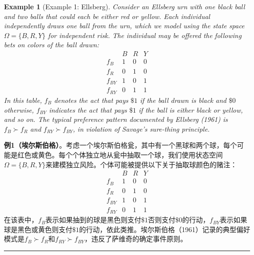 \documentclass[12pt,a4paper]{article}
\newenvironment{translation}
  {\par\noindent\color{blue!70!black}\smallskip}
  {\par\medskip\hrule\medskip}
\newtheorem{example}[theorem]{Example}
\begin{document}
\begin{example}[Example 1: Ellsberg]
Consider an Ellsberg urn with one black ball and two balls that could each be either red or yellow. Each individual independently draws one ball from the urn, which we model using the state space $\Omega = \{B, R, Y\}$ for independent risk. The individual may be offered the following bets on colors of the ball drawn:
\[
\begin{array}{c|ccc}
& B & R & Y \\
\hline
f_{B}  & 1 & 0 & 0 \\
f_{R}  & 0 & 1 & 0 \\
f_{BY} & 1 & 0 & 1 \\
f_{RY} & 0 & 1 & 1
\end{array}
\]
In this table, $f_B$ denotes the act that pays $\$1$ if the ball drawn is black and $\$0$ otherwise, $f_{BY}$ indicates the act that pays $\$1$ if the ball is either black or yellow, and so on. The typical preference pattern documented by Ellsberg (1961) is $f_B \succ f_R$ and $f_{RY} \succ f_{BY}$, in violation of Savage's sure-thing principle.
\end{example}
\begin{translation}
\textbf{例1（埃尔斯伯格）}。考虑一个埃尔斯伯格瓮，其中有一个黑球和两个球，每个可能是红色或黄色。每个个体独立地从瓮中抽取一个球，我们使用状态空间$\Omega = \{B, R, Y\}$来建模独立风险。个体可能被提供以下关于抽取球颜色的赌注：
\[
\begin{array}{c|ccc}
& B & R & Y \\
\hline
f_{B}  & 1 & 0 & 0 \\
f_{R}  & 0 & 1 & 0 \\
f_{BY} & 1 & 0 & 1 \\
f_{RY} & 0 & 1 & 1
\end{array}
\]
在该表中，$f_B$表示如果抽到的球是黑色则支付$\$1$否则支付$\$0$的行动，$f_{BY}$表示如果球是黑色或黄色则支付$\$1$的行动，依此类推。埃尔斯伯格（1961）记录的典型偏好模式是$f_B \succ f_R$和$f_{RY} \succ f_{BY}$，违反了萨维奇的确定事件原则。
\end{translation}
\end{document}
